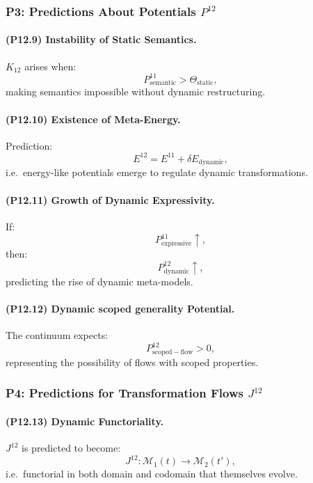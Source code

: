 \subsubsection{P3: Predictions About Potentials $P^{12}$}

\paragraph{(P12.9) Instability of Static Semantics.}
$K_{12}$ arises when:
\[
P_{\mathrm{semantic}}^{11} > \Theta_{\mathrm{static}},
\]
making semantics impossible without dynamic restructuring.

\paragraph{(P12.10) Existence of Meta-Energy.}
Prediction:
\[
E^{12} = E^{11} + \delta E_{\mathrm{dynamic}},
\]
i.e.\ energy-like potentials emerge to regulate dynamic transformations.

\paragraph{(P12.11) Growth of Dynamic Expressivity.}
If:
\[
P_{\mathrm{expressive}}^{11} \uparrow,
\]
then:
\[
P_{\mathrm{dynamic}}^{12} \uparrow,
\]
predicting the rise of dynamic meta-models.

\paragraph{(P12.12) Dynamic scoped generality Potential.}
The continuum expects:
\[
P_{\mathrm{scoped-flow}}^{12} > 0,
\]
representing the possibility of flows with scoped properties.

\subsubsection{P4: Predictions for Transformation Flows $J^{12}$}

\paragraph{(P12.13) Dynamic Functoriality.}
$J^{12}$ is predicted to become:
\[
J^{12}: \mathcal{M}_1(t) \to \mathcal{M}_2(t'),
\]
i.e.\ functorial in both domain and codomain that themselves evolve.

